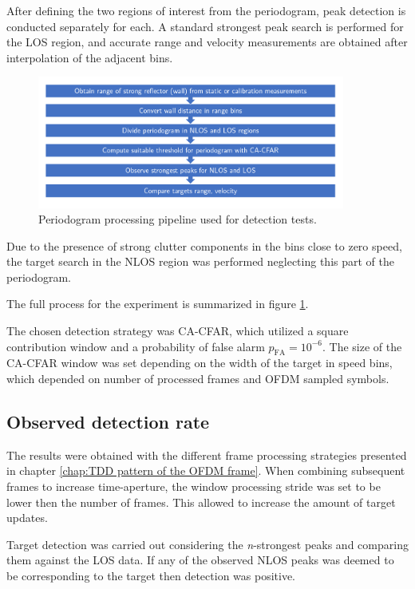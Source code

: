 After defining the two regions of interest from the periodogram, peak detection is conducted separately for each. A standard strongest peak search is performed for the LOS region, and accurate range and velocity measurements are obtained after interpolation of the adjacent bins.

\begin{figure}[H]
	\centering
	\includegraphics[width=0.9\textwidth]{Images/Test1/NLOS-proc-pipeline.png}
	\caption{Periodogram processing pipeline used for detection tests.}
	\label{fig:Test1_NLOS-proc-pipeline}
\end{figure}


Due to the presence of strong clutter components in the bins close to zero speed, the target search in the NLOS region was performed neglecting this part of the periodogram.

The full process for the experiment is summarized in figure \ref{fig:Test1_NLOS-proc-pipeline}.

The chosen detection strategy was CA-CFAR, which utilized a square contribution window and a probability of false alarm $p_{\text{FA}} = 10^{-6}$. The size of the CA-CFAR window was set depending on the width of the target in speed bins, which depended on number of processed frames and OFDM sampled symbols.

\subsection{Observed detection rate}

The results were obtained with the different frame processing strategies presented in chapter \ref{chap:TDD pattern of the OFDM frame}. When combining subsequent frames to increase time-aperture, the window processing stride was set to be lower then the number of frames. This allowed to increase the amount of target updates.

Target detection was carried out considering the \textit{n}-strongest peaks and comparing them against the LOS data. If any of the observed NLOS peaks was deemed to be corresponding to the target then detection was positive.

